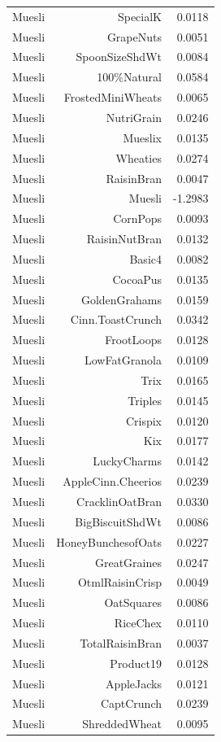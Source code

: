 \begin{longtable}{@{}lrr@{}}
Muesli & SpecialK & 0.0118 \\
Muesli & GrapeNuts & 0.0051 \\
Muesli & SpoonSizeShdWt & 0.0084 \\
Muesli & 100\%Natural & 0.0584 \\
Muesli & FrostedMiniWheats & 0.0065 \\
Muesli & NutriGrain & 0.0246 \\
Muesli & Mueslix & 0.0135 \\
Muesli & Wheaties & 0.0274 \\
Muesli & RaisinBran & 0.0047 \\
Muesli & Muesli & -1.2983 \\
Muesli & CornPops & 0.0093 \\
Muesli & RaisinNutBran & 0.0132 \\
Muesli & Basic4 & 0.0082 \\
Muesli & CocoaPus & 0.0135 \\
Muesli & GoldenGrahams & 0.0159 \\
Muesli & Cinn.ToastCrunch & 0.0342 \\
Muesli & FrootLoops & 0.0128 \\
Muesli & LowFatGranola & 0.0109 \\
Muesli & Trix & 0.0165 \\
Muesli & Triples & 0.0145 \\
Muesli & Crispix & 0.0120 \\
Muesli & Kix & 0.0177 \\
Muesli & LuckyCharms & 0.0142 \\
Muesli & AppleCinn.Cheerios & 0.0239 \\
Muesli & CracklinOatBran & 0.0330 \\
Muesli & BigBiscuitShdWt & 0.0086 \\
Muesli & HoneyBunchesofOats & 0.0227 \\
Muesli & GreatGraines & 0.0247 \\
Muesli & OtmlRaisinCrisp & 0.0049 \\
Muesli & OatSquares & 0.0086 \\
Muesli & RiceChex & 0.0110 \\
Muesli & TotalRaisinBran & 0.0037 \\
Muesli & Product19 & 0.0128 \\
Muesli & AppleJacks & 0.0121 \\
Muesli & CaptCrunch & 0.0239 \\
Muesli & ShreddedWheat & 0.0095 \\

\end{longtable}
